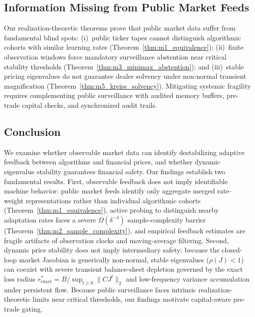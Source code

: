 \documentclass[12pt]{article}
\theoremstyle{definition}
\theoremstyle{remark}
\begin{document}
\enlargethispage{8\baselineskip}
\subsection{Information Missing from Public Market Feeds}
\label{sec:missing_info}
Our realization-theoretic theorems prove that public market data suffer from fundamental blind spots: (i)~public ticker tapes cannot distinguish algorithmic cohorts with similar learning rates (Theorem~\ref{thm:m1_equivalence}); (ii)~finite observation windows force mandatory surveillance abstention near critical stability thresholds (Theorem~\ref{thm:m3_minimax_abstention}); and (iii)~stable pricing eigenvalues do not guarantee dealer solvency under non-normal transient magnification (Theorem~\ref{thm:m5_kreiss_solvency}). Mitigating systemic fragility requires complementing public surveillance with audited memory buffers, pre-trade capital checks, and synchronized audit trails.

\subsection{Conclusion}
We examine whether observable market data can identify destabilizing adaptive feedback between algorithms and financial prices, and whether dynamic eigenvalue stability guarantees financial safety. Our findings establish two fundamental results. First, observable feedback does not imply identifiable machine behavior: public market feeds identify only aggregate merged rate--weight representations rather than individual algorithmic cohorts (Theorem~\ref{thm:m1_equivalence}), active probing to distinguish nearby adaptation rates faces a severe $\Omega(\delta^{-4})$ sample-complexity barrier (Theorem~\ref{thm:m2_sample_complexity}), and empirical feedback estimates are fragile artifacts of observation clocks and moving-average filtering. Second, dynamic price stability does not imply intermediary safety: because the closed-loop market Jacobian is generically non-normal, stable eigenvalues ($\rho(J) < 1$) can coexist with severe transient balance-sheet depletion governed by the exact loss radius $r^*_{\text{exact}} = B / \sup_{t \ge 0} \|C J^t\|_2$ and low-frequency variance accumulation under persistent flow. Because public surveillance faces intrinsic realization-theoretic limits near critical thresholds, our findings motivate capital-aware pre-trade gating.
\end{document}
